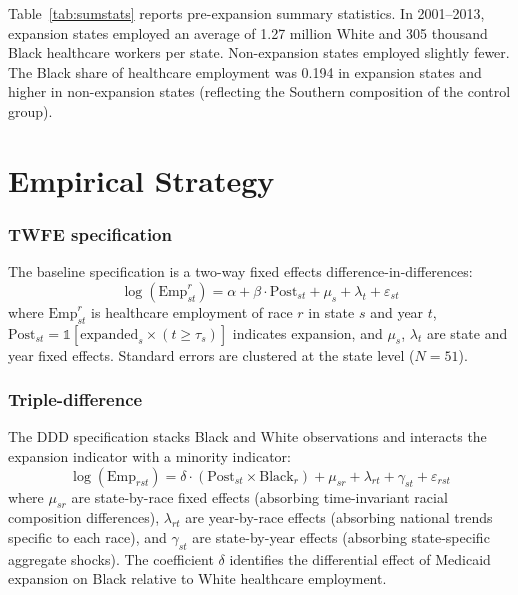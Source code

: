 \documentclass[12pt]{article}
\begin{document}


Table~\ref{tab:sumstats} reports pre-expansion summary statistics. In 2001--2013, expansion states employed an average of 1.27 million White and 305 thousand Black healthcare workers per state. Non-expansion states employed slightly fewer. The Black share of healthcare employment was 0.194 in expansion states and higher in non-expansion states (reflecting the Southern composition of the control group).

\section{Empirical Strategy}
\label{sec:empirics}

\subsubsection*{TWFE specification} The baseline specification is a two-way fixed effects difference-in-differences:
\begin{equation}
\label{eq:twfe}
\log(\text{Emp}_{st}^{r}) = \alpha + \beta \cdot \text{Post}_{st} + \mu_s + \lambda_t + \varepsilon_{st}
\end{equation}
where $\text{Emp}_{st}^{r}$ is healthcare employment of race $r$ in state $s$ and year $t$, $\text{Post}_{st} = \mathbb{1}[\text{expanded}_s \times (t \geq \tau_s)]$ indicates expansion, and $\mu_s$, $\lambda_t$ are state and year fixed effects. Standard errors are clustered at the state level ($N = 51$).

\subsubsection*{Triple-difference} The DDD specification stacks Black and White observations and interacts the expansion indicator with a minority indicator:
\begin{equation}
\label{eq:ddd}
\log(\text{Emp}_{rst}) = \delta \cdot (\text{Post}_{st} \times \text{Black}_r) + \mu_{sr} + \lambda_{rt} + \gamma_{st} + \varepsilon_{rst}
\end{equation}
where $\mu_{sr}$ are state-by-race fixed effects (absorbing time-invariant racial composition differences), $\lambda_{rt}$ are year-by-race effects (absorbing national trends specific to each race), and $\gamma_{st}$ are state-by-year effects (absorbing state-specific aggregate shocks). The coefficient $\delta$ identifies the differential effect of Medicaid expansion on Black relative to White healthcare employment.
\end{document}

